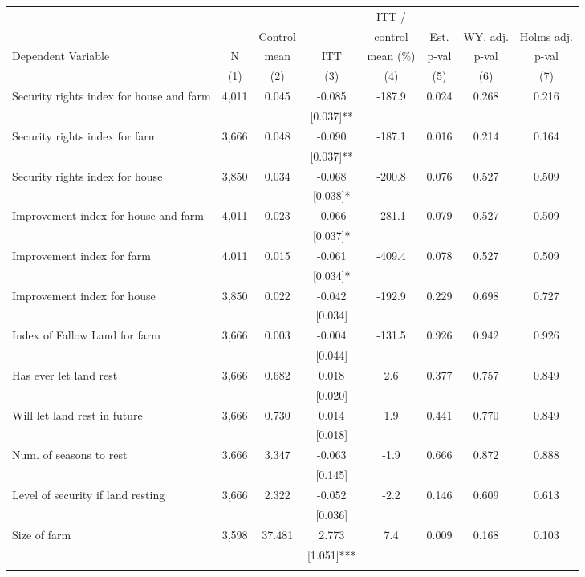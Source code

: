 \begin{tabular}{lccccccc}
\hline \noalign{\smallskip} &  &  &  & ITT / &  &  & \\
 &  & Control &  & control & Est. & WY. adj. & Holms adj.\\
Dependent Variable & N & mean & ITT & mean (\%) & p-val & p-val & p-val\\
 & (1) & (2) & (3) & (4) & (5) & (6) & (7)\\
\noalign{\smallskip}\hline \noalign{\smallskip}Security rights index for house and farm & 4,011 & 0.045 & -0.085 & -187.9 & 0.024 & 0.268 & 0.216\\
 &  &  & [0.037]** &  &  &  & \\
\quad Security rights index for farm & 3,666 & 0.048 & -0.090 & -187.1 & 0.016 & 0.214 & 0.164\\
 &  &  & [0.037]** &  &  &  & \\
\quad Security rights index for house & 3,850 & 0.034 & -0.068 & -200.8 & 0.076 & 0.527 & 0.509\\
 &  &  & [0.038]* &  &  &  & \\
Improvement index for house and farm & 4,011 & 0.023 & -0.066 & -281.1 & 0.079 & 0.527 & 0.509\\
 &  &  & [0.037]* &  &  &  & \\
\quad Improvement index for farm & 4,011 & 0.015 & -0.061 & -409.4 & 0.078 & 0.527 & 0.509\\
 &  &  & [0.034]* &  &  &  & \\
\quad Improvement index for house & 3,850 & 0.022 & -0.042 & -192.9 & 0.229 & 0.698 & 0.727\\
 &  &  & [0.034] &  &  &  & \\
Index of Fallow Land for farm & 3,666 & 0.003 & -0.004 & -131.5 & 0.926 & 0.942 & 0.926\\
 &  &  & [0.044] &  &  &  & \\
\quad Has ever let land rest & 3,666 & 0.682 & 0.018 & 2.6 & 0.377 & 0.757 & 0.849\\
 &  &  & [0.020] &  &  &  & \\
\quad Will let land rest in future & 3,666 & 0.730 & 0.014 & 1.9 & 0.441 & 0.770 & 0.849\\
 &  &  & [0.018] &  &  &  & \\
\quad Num. of seasons to rest & 3,666 & 3.347 & -0.063 & -1.9 & 0.666 & 0.872 & 0.888\\
 &  &  & [0.145] &  &  &  & \\
\quad Level of security if land resting & 3,666 & 2.322 & -0.052 & -2.2 & 0.146 & 0.609 & 0.613\\
 &  &  & [0.036] &  &  &  & \\
Size of farm & 3,598 & 37.481 & 2.773 & 7.4 & 0.009 & 0.168 & 0.103\\
 &  &  & [1.051]*** &  &  &  & \\
\noalign{\smallskip}\hline\end{tabular}
